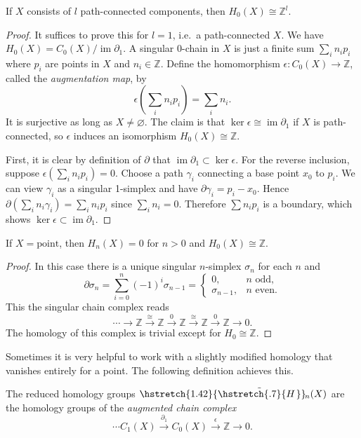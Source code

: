 \documentclass[english,letterpaper]{article}%
\numberwithin{equation}{section}
\numberwithin{figure}{section}
\numberwithin{table}{section}
\theoremstyle{definition}
\theoremstyle{definition}
\theoremstyle{definition}
\theoremstyle{plain}
\theoremstyle{plain}
\theoremstyle{plain}
\theoremstyle{plain}
\theoremstyle{remark}
\theoremstyle{remark}
\newcommand{\bbZ}{\mathbb{Z}}
\DeclareMathOperator{\im}{im}
\newcommand\wt[1]{\hstretch{1.42}{\tilde{\hstretch{.7}{#1\mkern2mu}}}\mkern-2mu}
\begin{document}
\begin{prop}
    If $X$ consists of $l$ path-connected components, then $H_0(X)\cong \bbZ^l$.
\end{prop}
\begin{proof}
     It suffices to prove this for $l=1$, i.e.\ a path-connected $X$. We have $H_0(X)=C_0(X)/\im\partial_1$. A singular 0-chain in $X$ is just a finite sum $\sum_i n_i p_i$ where $p_i$ are points in $X$ and $n_i\in\bbZ$. Define the homomorphism $\epsilon:C_0(X)\to \bbZ$, called the \emph{augmentation map}, by
     \[\epsilon\left(\sum_i n_i p_i\right)=\sum_i n_i.\]
     It is surjective as long as $X\neq\varnothing$. The claim is that $\ker\epsilon\cong\im\partial_1$ if $X$ is path-connected, so $\epsilon $ induces an isomorphism $H_0(X)\cong \bbZ$.
     
     First, it is clear by definition of $\partial$ that $\im\partial_1\subset\ker\epsilon$. For the reverse inclusion, suppose $\epsilon(\sum_i n_i p_i)=0$. Choose a path $\gamma_i$ connecting a base point $x_0$ to $p_i$. We can view $\gamma_i$ as a singular 1-simplex and have $\partial\gamma_i=p_i-x_0$. Hence $\partial(\sum_i n_i\gamma_i)=\sum_i n_i p_i$ since $\sum_i n_i=0$. Therefore $\sum n_i p_i$ is a boundary, which shows $\ker\epsilon\subset\im\partial_1$.
\end{proof}

\begin{prop}
    If $X=\text{point}$, then $H_n(X)=0$ for $n>0$ and $H_0(X)\cong \bbZ$.
\end{prop}
\begin{proof}
     In this case there is a unique singular $n$-simplex $\sigma_n$ for each $n$ and 
     \[\partial\sigma_n=\sum_{i=0}^n(-1)^i\sigma_{n-1}=\begin{cases}
     0,& n\text{ odd},\\
     \sigma_{n-1},& n\text{ even}.
     \end{cases}\]
     This the singular chain complex reads
     \[\cdots\to \bbZ\overset\cong\to \bbZ\overset 0\to \bbZ\overset\cong\to\bbZ\overset 0\to\bbZ\to 0.\]
     The homology of this complex is trivial except for $H_0\cong \bbZ $.
\end{proof}

Sometimes it is very helpful to work with a slightly modified homology that vanishes entirely for a point. The following definition achieves this.

\begin{defn}
    The reduced homology groups $\wt{H}_n(X)$ are the homology groups of the \emph{augmented chain complex}
    \[\cdots C_1(X)\overset{\partial_1}\to C_0(X)\overset{\epsilon}\to \bbZ\to 0.\]
\end{defn}
\end{document}
